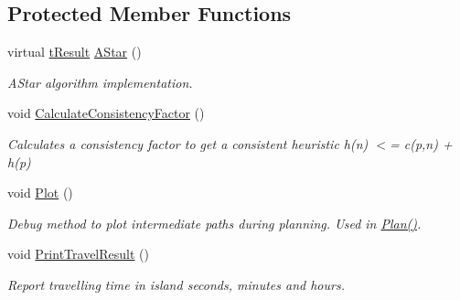 \subsection*{Protected Member Functions}
\begin{DoxyCompactItemize}
\item 
virtual \mbox{\hyperlink{structt_result}{t\+Result}} \mbox{\hyperlink{classplanner_1_1c_planner_a341e70531266f023ac9461d18979d1ef}{A\+Star}} ()
\begin{DoxyCompactList}\small\item\em A\+Star algorithm implementation. \end{DoxyCompactList}\item 
void \mbox{\hyperlink{classplanner_1_1c_planner_a2e5a745f83f903662eff914d8beddb5e}{Calculate\+Consistency\+Factor}} ()
\begin{DoxyCompactList}\small\item\em Calculates a consistency factor to get a consistent heuristic h(n) $<$= c(p,n) + h(p) \end{DoxyCompactList}\item 
\mbox{\label{classplanner_1_1c_planner_a236a68e02c7a99323f2d30b3097aa767}} 
void \mbox{\hyperlink{classplanner_1_1c_planner_a236a68e02c7a99323f2d30b3097aa767}{Plot}} ()
\begin{DoxyCompactList}\small\item\em Debug method to plot intermediate paths during planning. Used in \mbox{\hyperlink{classplanner_1_1c_planner_a21230c015260b9fc34ad2f239592470e}{Plan()}}. \end{DoxyCompactList}\item 
\mbox{\label{classplanner_1_1c_planner_ad8d82968444f958f1b7e7acdd9df2e64}} 
void \mbox{\hyperlink{classplanner_1_1c_planner_ad8d82968444f958f1b7e7acdd9df2e64}{Print\+Travel\+Result}} ()
\begin{DoxyCompactList}\small\item\em Report travelling time in island seconds, minutes and hours. \end{DoxyCompactList}\end{DoxyCompactItemize}
